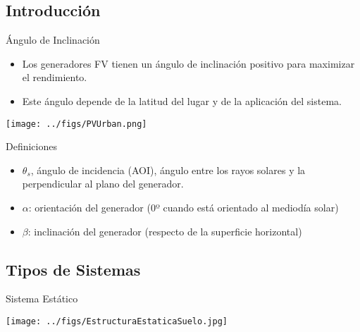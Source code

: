 \documentclass[xcolor={usenames,svgnames,dvipsnames}]{beamer}
\begin{document}
\subsection{Introducción}
\label{sec:orge5253c7}

\begin{frame}[label={sec:orga172887}]{Ángulo de Inclinación}
\begin{itemize}
\item Los generadores FV tienen un ángulo de inclinación positivo para maximizar el rendimiento.
\item Este ángulo depende de la latitud del lugar y de la aplicación del sistema.
\end{itemize}

\begin{center}
\texttt{[image: ../figs/PVUrban.png]}
\end{center}
\end{frame}

\begin{frame}[label={sec:orga9e3ce7}]{Definiciones}
\begin{itemize}
\item \(\theta_s\), \alert{ángulo de incidencia (AOI)}, ángulo entre los rayos solares y la perpendicular al plano del generador.
\item \(\alpha\): \alert{orientación del generador} (0º cuando está orientado al mediodía solar)
\item \(\beta\): \alert{inclinación del generador} (respecto de la superficie horizontal)
\end{itemize}
\end{frame}
\subsection{Tipos de Sistemas}
\label{sec:org6fee64e}
\begin{frame}[label={sec:orgc6b4b95}]{Sistema Estático}
\begin{center}
\texttt{[image: ../figs/EstructuraEstaticaSuelo.jpg]}
\end{center}
\end{frame}
\end{document}
